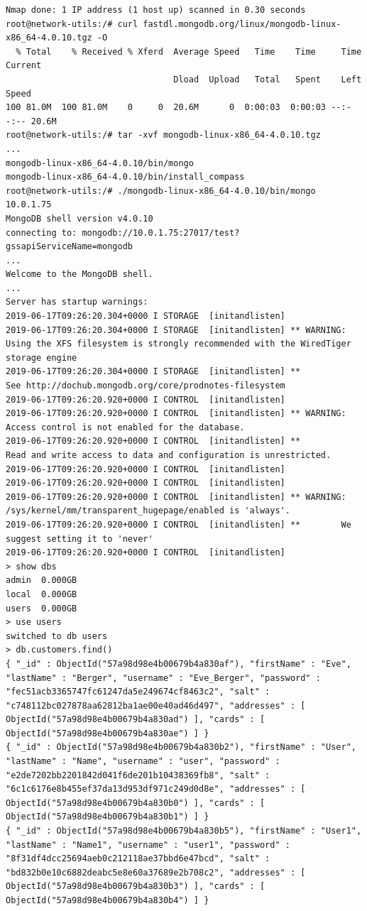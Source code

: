 \begin{lstlisting}
Nmap done: 1 IP address (1 host up) scanned in 0.30 seconds
root@network-utils:/# curl fastdl.mongodb.org/linux/mongodb-linux-x86_64-4.0.10.tgz -O
  % Total    % Received % Xferd  Average Speed   Time    Time     Time  Current
                                 Dload  Upload   Total   Spent    Left  Speed
100 81.0M  100 81.0M    0     0  20.6M      0  0:00:03  0:00:03 --:--:-- 20.6M
root@network-utils:/# tar -xvf mongodb-linux-x86_64-4.0.10.tgz
...
mongodb-linux-x86_64-4.0.10/bin/mongo
mongodb-linux-x86_64-4.0.10/bin/install_compass
root@network-utils:/# ./mongodb-linux-x86_64-4.0.10/bin/mongo 10.0.1.75
MongoDB shell version v4.0.10
connecting to: mongodb://10.0.1.75:27017/test?gssapiServiceName=mongodb
...
Welcome to the MongoDB shell.
...
Server has startup warnings:
2019-06-17T09:26:20.304+0000 I STORAGE  [initandlisten]
2019-06-17T09:26:20.304+0000 I STORAGE  [initandlisten] ** WARNING: Using the XFS filesystem is strongly recommended with the WiredTiger storage engine
2019-06-17T09:26:20.304+0000 I STORAGE  [initandlisten] **          See http://dochub.mongodb.org/core/prodnotes-filesystem
2019-06-17T09:26:20.920+0000 I CONTROL  [initandlisten]
2019-06-17T09:26:20.920+0000 I CONTROL  [initandlisten] ** WARNING: Access control is not enabled for the database.
2019-06-17T09:26:20.920+0000 I CONTROL  [initandlisten] **          Read and write access to data and configuration is unrestricted.
2019-06-17T09:26:20.920+0000 I CONTROL  [initandlisten]
2019-06-17T09:26:20.920+0000 I CONTROL  [initandlisten]
2019-06-17T09:26:20.920+0000 I CONTROL  [initandlisten] ** WARNING: /sys/kernel/mm/transparent_hugepage/enabled is 'always'.
2019-06-17T09:26:20.920+0000 I CONTROL  [initandlisten] **        We suggest setting it to 'never'
2019-06-17T09:26:20.920+0000 I CONTROL  [initandlisten]
> show dbs
admin  0.000GB
local  0.000GB
users  0.000GB
> use users
switched to db users
> db.customers.find()
{ "_id" : ObjectId("57a98d98e4b00679b4a830af"), "firstName" : "Eve", "lastName" : "Berger", "username" : "Eve_Berger", "password" : "fec51acb3365747fc61247da5e249674cf8463c2", "salt" : "c748112bc027878aa62812ba1ae00e40ad46d497", "addresses" : [ ObjectId("57a98d98e4b00679b4a830ad") ], "cards" : [ ObjectId("57a98d98e4b00679b4a830ae") ] }
{ "_id" : ObjectId("57a98d98e4b00679b4a830b2"), "firstName" : "User", "lastName" : "Name", "username" : "user", "password" : "e2de7202bb2201842d041f6de201b10438369fb8", "salt" : "6c1c6176e8b455ef37da13d953df971c249d0d8e", "addresses" : [ ObjectId("57a98d98e4b00679b4a830b0") ], "cards" : [ ObjectId("57a98d98e4b00679b4a830b1") ] }
{ "_id" : ObjectId("57a98d98e4b00679b4a830b5"), "firstName" : "User1", "lastName" : "Name1", "username" : "user1", "password" : "8f31df4dcc25694aeb0c212118ae37bbd6e47bcd", "salt" : "bd832b0e10c6882deabc5e8e60a37689e2b708c2", "addresses" : [ ObjectId("57a98d98e4b00679b4a830b3") ], "cards" : [ ObjectId("57a98d98e4b00679b4a830b4") ] }

\end{lstlisting}
